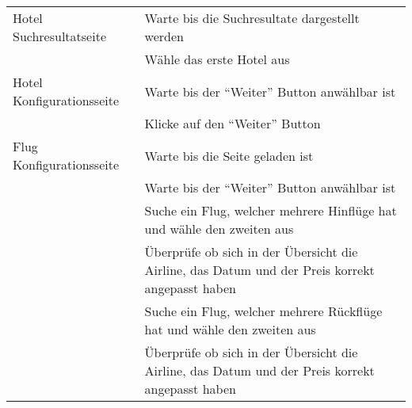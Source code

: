 \begin{table}[H]
\begin{tabularx}{0.9\textwidth}{ | l | X | }
		\multirow{1}{*}{Hotel Suchresultatseite} & Warte bis die Suchresultate dargestellt werden \\ \cline{2-2}
		& Wähle das erste Hotel aus \\ \hline
		
		\multirow{1}{*}{Hotel Konfigurationsseite} & Warte bis der "`Weiter"' Button anwählbar ist \\ \cline{2-2}
		& Klicke auf den "`Weiter"' Button \\ \hline
				
		\multirow{1}{*}{Flug Konfigurationsseite} & Warte bis die Seite geladen ist \\ \cline{2-2}
		& Warte bis der "`Weiter"' Button anwählbar ist \\ \cline{2-2}
		& Suche ein Flug, welcher mehrere Hinflüge hat und wähle den zweiten aus \\ \cline{2-2}
		& Überprüfe ob sich in der Übersicht die Airline, das Datum und der Preis korrekt angepasst haben\\ \cline{2-2}
		& Suche ein Flug, welcher mehrere Rückflüge hat und wähle den zweiten aus \\ \cline{2-2}
		& Überprüfe ob sich in der Übersicht die Airline, das Datum und der Preis korrekt angepasst haben\\ \cline{2-2}
	\end{tabularx} 
\end{table}

